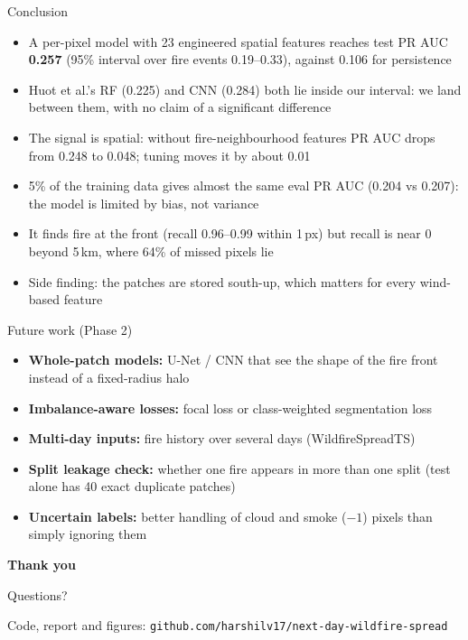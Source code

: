 \documentclass[aspectratio=169,11pt]{beamer}
\begin{document}
\begin{frame}{Conclusion}
\begin{itemize}
\item A per-pixel model with 23 engineered spatial features reaches test PR AUC \textbf{0.257} (95\% interval over fire events 0.19--0.33), against 0.106 for persistence
\item Huot et al.'s RF (0.225) and CNN (0.284) both lie inside our interval: we land between them, with no claim of a significant difference
\item The signal is spatial: without fire-neighbourhood features PR AUC drops from 0.248 to 0.048; tuning moves it by about 0.01
\item 5\% of the training data gives almost the same eval PR AUC (0.204 vs 0.207): the model is limited by bias, not variance
\item It finds fire at the front (recall 0.96--0.99 within 1\,px) but recall is near 0 beyond 5\,km, where 64\% of missed pixels lie
\item Side finding: the patches are stored south-up, which matters for every wind-based feature
\end{itemize}
\end{frame}

\begin{frame}{Future work (Phase 2)}
\begin{itemize}
\item \textbf{Whole-patch models:} U-Net / CNN that see the shape of the fire front instead of a fixed-radius halo
\item \textbf{Imbalance-aware losses:} focal loss or class-weighted segmentation loss
\item \textbf{Multi-day inputs:} fire history over several days (WildfireSpreadTS)
\item \textbf{Split leakage check:} whether one fire appears in more than one split (test alone has 40 exact duplicate patches)
\item \textbf{Uncertain labels:} better handling of cloud and smoke ($-1$) pixels than simply ignoring them
\end{itemize}
\end{frame}

\begin{frame}[plain]
\centering
\vfill
{\color{accent}\Huge\bfseries Thank you\par}
\vspace{0.8em}
{\large Questions?\par}
\vspace{1.5em}
{\small\color{muted}Code, report and figures: \texttt{github.com/harshilv17/next-day-wildfire-spread}\par}
\vfill
\end{frame}
\end{document}
